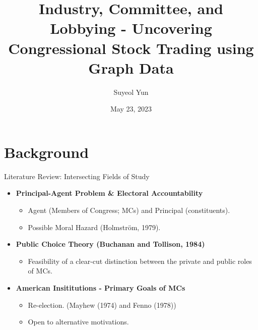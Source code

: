 \documentclass{beamer}
\begin{document}
	\title[]{Industry, Committee, and Lobbying - Uncovering Congressional Stock Trading using Graph Data}
	\author[Suyeol Yun]{Suyeol Yun}
	\date{May 23, 2023}
	\frame{\titlepage}
	\section{Background}


	\begin{frame}{Literature Review: Intersecting Fields of Study}
		\begin{itemize}
			\item \textbf{Principal-Agent Problem \& Electoral Accountability}
				\begin{itemize}
					\item Agent (Members of Congress; MCs) and Principal (constituents).
					\item Possible Moral Hazard (Holmström, 1979).
				\end{itemize}
			\item \textbf{Public Choice Theory (Buchanan and Tollison, 1984)}
				\begin{itemize}
					\item Feasibility of a clear-cut distinction between the private and public roles of MCs.
				\end{itemize}
			\item \textbf{American Insititutions - Primary Goals of MCs}
				\begin{itemize}
					\item Re-election. 					(Mayhew (1974) and Fenno (1978))
					\item Open to alternative motivations.
				\end{itemize}
		\end{itemize}
	\end{frame}
	
\end{document}
